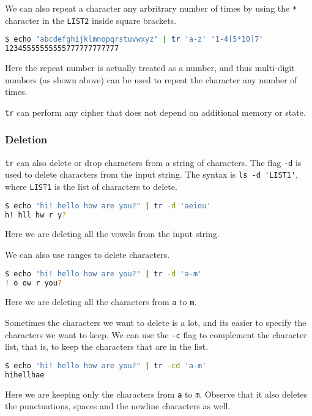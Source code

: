 We can also repeat a character any arbritrary number of times by using the \lstinline|*| character in the \lstinline|LIST2| inside square brackets.

\begin{lstlisting}[language=bash]
$ echo "abcdefghijklmnopqrstuvwxyz" | tr 'a-z' '1-4[5*10]7'
12345555555555777777777777
\end{lstlisting}

Here the repeat number is actually treated as a number, and thus multi-digit numbers (as shown above) can be used to repeat the character any number of times.

\lstinline|tr| can perform any cipher that does not depend on additional memory or state.

\subsubsection{Deletion}

\lstinline|tr| can also delete or drop characters from a string of characters.
The flag \lstinline|-d| is used to delete characters from the input string.
The syntax is \lstinline|ls -d 'LIST1'|, where \lstinline|LIST1| is the list of characters to delete.

\begin{lstlisting}[language=bash]
$ echo "hi! hello how are you?" | tr -d 'aeiou'
h! hll hw r y?
\end{lstlisting}

Here we are deleting all the vowels from the input string.

We can also use ranges to delete characters.

\begin{lstlisting}[language=bash]
$ echo "hi! hello how are you?" | tr -d 'a-m'
! o ow r you?
\end{lstlisting}

Here we are deleting all the characters from \lstinline|a| to \lstinline|m|.

Sometimes the characters we want to delete is a lot, and its easier to specify the characters we want to keep. We can use the \lstinline|-c| flag to complement the character list, that is, to keep the characters that are in the list.

\begin{lstlisting}[language=bash]
$ echo "hi! hello how are you?" | tr -cd 'a-m'
hihellhae
\end{lstlisting}

Here we are keeping only the characters from \lstinline|a| to \lstinline|m|.
Observe that it also deletes the punctuations, spaces and the newline characters
as well.

